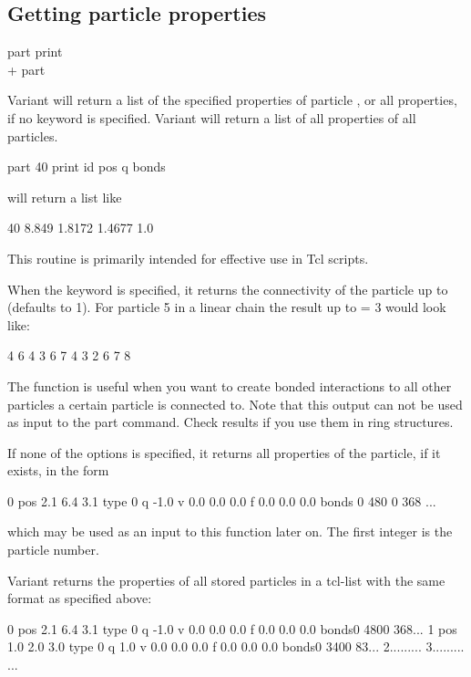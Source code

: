 \subsection{Getting particle properties}

\begin{essyntax}
  part  print\\
  +
  part
\end{essyntax}

Variant  will return a list of the specified properties of
particle , or all properties, if no keyword is
specified.  Variant  will return a list of all properties
of all particles.

\begin{code}
part 40 print id pos q bonds
\end{code}
will return a list like
\begin{tclcode}
40 8.849 1.8172 1.4677 1.0 {}
\end{tclcode}
This routine is primarily intended for effective use in Tcl scripts.

When the keyword  is specified, it returns the
connectivity of the particle up to  (defaults to 1). For
particle 5 in a linear chain the result up to  = 3 would
look like:
\begin{tclcode}
{ { 4 } { 6 } } { { 4 3 } { 6 7 } } { {4 3 2 } { 6 7 8 } } 
\end{tclcode}
The function is useful when you want to create bonded interactions to
all other particles a certain particle is connected to. Note that this
output can not be used as input to the part command. Check results if
you use them in ring structures.

If none of the options is specified, it returns all properties of the
particle, if it exists, in the form
\begin{tclcode}
  0 pos 2.1 6.4 3.1 type 0 q -1.0 v 0.0 0.0 0.0 f 0.0 0.0 0.0
  bonds { {0 480} {0 368} ... } 
\end{tclcode}
which may be used as an input to this function later on. The first
integer is the particle number.

Variant  returns the properties of all stored particles in
a tcl-list with the same format as specified above:
\begin{tclcode}
{0 pos 2.1 6.4 3.1 type 0 q -1.0 v 0.0 0.0 0.0 f 0.0 0.0 0.0
 bonds{{0 480}{0 368}...}} 
{1 pos 1.0 2.0 3.0 type 0 q 1.0 v 0.0 0.0 0.0 f 0.0 0.0 0.0
 bonds{{0 340}{0 83}...}} 
{2...{{...}...}}
{3...{{...}...}}
...
\end{tclcode}

